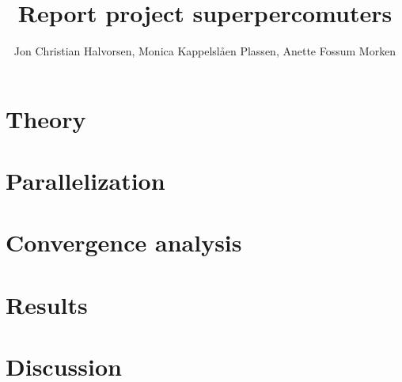 \documentclass[10pt, a4paper]{article} %
\title{Report project superpercomuters}
\author[]{Jon Christian Halvorsen, Monica Kappelslåen Plassen, Anette Fossum Morken}
\date{}
\begin{document}
\maketitle
{}


\section*{Theory}



\section*{Parallelization}

 
\section*{Convergence analysis}



\section*{Results}


\section*{Discussion}



%
%
\end{document}
